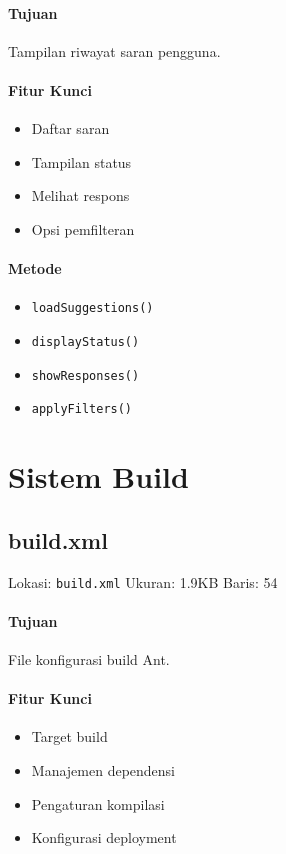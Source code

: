 \documentclass[12pt,a4paper]{article}
\begin{document}
\paragraph{Tujuan}
Tampilan riwayat saran pengguna.

\paragraph{Fitur Kunci}
\begin{itemize}
    \item Daftar saran
    \item Tampilan status
    \item Melihat respons
    \item Opsi pemfilteran
\end{itemize}

\paragraph{Metode}
\begin{itemize}
    \item \texttt{loadSuggestions()}
    \item \texttt{displayStatus()}
    \item \texttt{showResponses()}
    \item \texttt{applyFilters()}
\end{itemize}

\section{Sistem Build}
\subsection{build.xml}
Lokasi: \texttt{build.xml}
Ukuran: 1.9KB
Baris: 54

\paragraph{Tujuan}
File konfigurasi build Ant.

\paragraph{Fitur Kunci}
\begin{itemize}
    \item Target build
    \item Manajemen dependensi
    \item Pengaturan kompilasi
    \item Konfigurasi deployment
\end{itemize}
\end{document}
